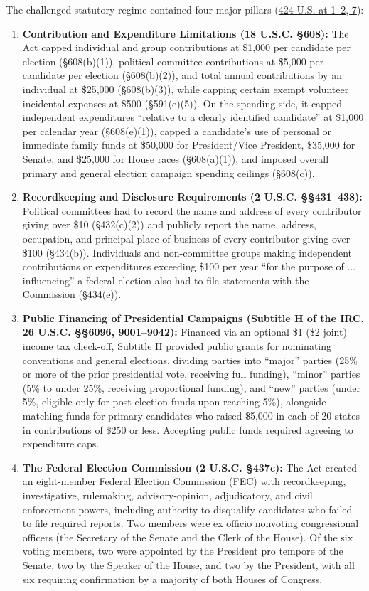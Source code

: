 \documentclass[12pt]{article}
\begin{document}
The challenged statutory regime contained four major pillars (\href{https://supreme.justia.com/cases/federal/us/424/1/}{424 U.S. at 1--2, 7}):
\begin{enumerate}
  \item \textbf{Contribution and Expenditure Limitations (18 U.S.C. \S 608):} The Act capped individual and group contributions at \$1,000 per candidate per election (\S 608(b)(1)), political committee contributions at \$5,000 per candidate per election (\S 608(b)(2)), and total annual contributions by an individual at \$25,000 (\S 608(b)(3)), while capping certain exempt volunteer incidental expenses at \$500 (\S 591(e)(5)). On the spending side, it capped independent expenditures ``relative to a clearly identified candidate'' at \$1,000 per calendar year (\S 608(e)(1)), capped a candidate's use of personal or immediate family funds at \$50,000 for President/Vice President, \$35,000 for Senate, and \$25,000 for House races (\S 608(a)(1)), and imposed overall primary and general election campaign spending ceilings (\S 608(c)).
  \item \textbf{Recordkeeping and Disclosure Requirements (2 U.S.C. \S\S 431--438):} Political committees had to record the name and address of every contributor giving over \$10 (\S 432(c)(2)) and publicly report the name, address, occupation, and principal place of business of every contributor giving over \$100 (\S 434(b)). Individuals and non-committee groups making independent contributions or expenditures exceeding \$100 per year ``for the purpose of ... influencing'' a federal election also had to file statements with the Commission (\S 434(e)).
  \item \textbf{Public Financing of Presidential Campaigns (Subtitle H of the IRC, 26 U.S.C. \S\S 6096, 9001--9042):} Financed via an optional \$1 (\$2 joint) income tax check-off, Subtitle H provided public grants for nominating conventions and general elections, dividing parties into ``major'' parties (25\% or more of the prior presidential vote, receiving full funding), ``minor'' parties (5\% to under 25\%, receiving proportional funding), and ``new'' parties (under 5\%, eligible only for post-election funds upon reaching 5\%), alongside matching funds for primary candidates who raised \$5,000 in each of 20 states in contributions of \$250 or less. Accepting public funds required agreeing to expenditure caps.
  \item \textbf{The Federal Election Commission (2 U.S.C. \S 437c):} The Act created an eight-member Federal Election Commission (FEC) with recordkeeping, investigative, rulemaking, advisory-opinion, adjudicatory, and civil enforcement powers, including authority to disqualify candidates who failed to file required reports. Two members were ex officio nonvoting congressional officers (the Secretary of the Senate and the Clerk of the House). Of the six voting members, two were appointed by the President pro tempore of the Senate, two by the Speaker of the House, and two by the President, with all six requiring confirmation by a majority of both Houses of Congress.
\end{enumerate}
\end{document}
